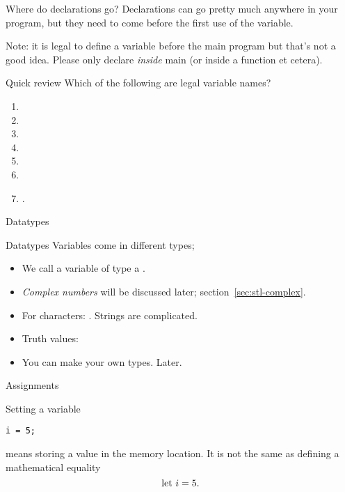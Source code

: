 \begin{block}{Where do declarations go?}
  \label{sl:declwhere}
  Declarations can go pretty much anywhere in your program, but they need
  to come before the first use of the variable.

  Note: it is legal to define a variable before the main program
  but that's not a good idea. Please only declare \emph{inside} main
  (or inside a function et cetera).
\end{block}

\begin{exercise}{Quick review}
  \label{q:varnames}
  Which of the following are legal variable names?
  \begin{enumerate}
  \item {} \item {} \item {}
  \item {} \item {} \item {} \item {}.
  \end{enumerate}
\end{exercise}

 {Datatypes}

\begin{block}{Datatypes}
  \label{sl:datatypes}
  Variables come in different types;
  \begin{itemize}
  \item We call a variable of type
     a .
  \item \emph{Complex numbers} will be
    discussed later; section~\ref{sec:stl-complex}.
  \item 
    For characters: . Strings are complicated.
  \item Truth values: 
  \item 
    You can make your own types. Later.
  \end{itemize}
\end{block}

 {Assignments}
\label{sec:ctypes}

Setting a variable
\begin{verbatim}
i = 5;
\end{verbatim}
means storing a value in the memory location. It is
not the same as defining a mathematical equality
\[ \hbox{let $i=5$}. \]

